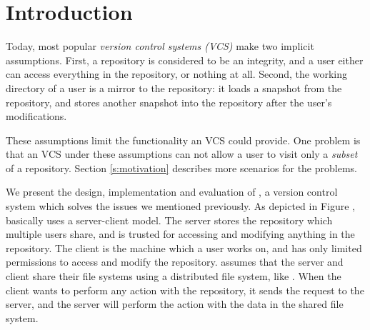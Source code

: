 \section{Introduction}
\label{s:intro}

Today, most popular  \emph{version control
systems (VCS)} make two implicit assumptions. First, a repository is considered to be
an integrity, and a user either can access everything in the repository, or
nothing at all. Second, the working directory of a user is a mirror to the
repository: it loads a snapshot from the repository, and stores another snapshot
into the repository after the user's modifications. 

These assumptions limit the functionality an VCS could provide.
One problem is that an VCS under these assumptions can not allow a user to
visit only a \emph{subset} of a repository. Section \ref{s:motivation} describes
more scenarios for the problems.



We present the design, implementation and evaluation of \sys, a version control
system which solves the issues we mentioned previously. As depicted in Figure
, \sys basically
uses a server-client model. The server stores the repository which multiple
users share, and is trusted for accessing and modifying anything in the
repository. The client is the machine which a user works on, and has only
limited permissions to access and modify the repository. \sys assumes that the
server and client share their file systems using a distributed file system, like
\nfs. %
When the client wants to perform any action with the repository, it sends the
request to the server, and the server will perform the action with the data in
the shared file system. 

